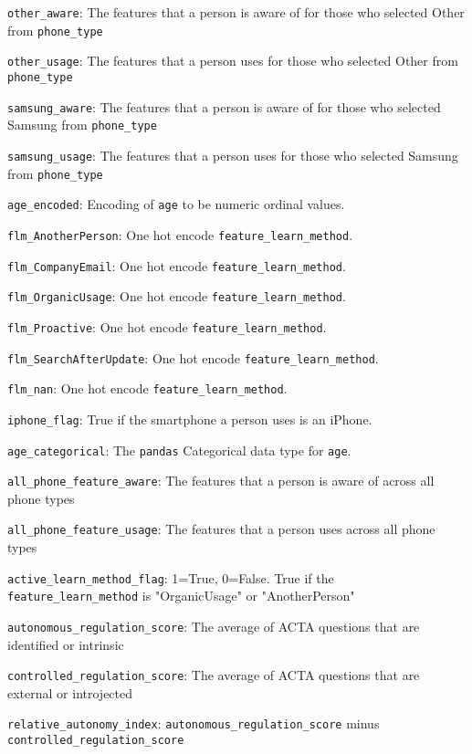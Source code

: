 \item \texttt{other\_aware}: The features that a person is aware of for those who selected Other from \texttt{phone\_type}
\item \texttt{other\_usage}: The features that a person uses for those who selected Other from \texttt{phone\_type}
\item \texttt{samsung\_aware}: The features that a person is aware of for those who selected Samsung from \texttt{phone\_type}
\item \texttt{samsung\_usage}: The features that a person uses for those who selected Samsung from \texttt{phone\_type}
\item \texttt{age\_encoded}: Encoding of \texttt{age} to be numeric ordinal values.
\item \texttt{flm\_AnotherPerson}: One hot encode \texttt{feature\_learn\_method}.
\item \texttt{flm\_CompanyEmail}: One hot encode \texttt{feature\_learn\_method}.
\item \texttt{flm\_OrganicUsage}: One hot encode \texttt{feature\_learn\_method}.
\item \texttt{flm\_Proactive}: One hot encode \texttt{feature\_learn\_method}.
\item \texttt{flm\_SearchAfterUpdate}: One hot encode \texttt{feature\_learn\_method}.
\item \texttt{flm\_nan}: One hot encode \texttt{feature\_learn\_method}.
\item \texttt{iphone\_flag}: True if the smartphone a person uses is an iPhone.
\item \texttt{age\_categorical}: The \texttt{pandas} Categorical data type for \texttt{age}.
\item \texttt{all\_phone\_feature\_aware}: The features that a person is aware of across all phone types
\item \texttt{all\_phone\_feature\_usage}: The features that a person uses across all phone types
\item \texttt{active\_learn\_method\_flag}: 1=True, 0=False. True if the \texttt{feature\_learn\_method} is "OrganicUsage" or "AnotherPerson"
\item \texttt{autonomous\_regulation\_score}: The average of ACTA questions that are identified or intrinsic
\item \texttt{controlled\_regulation\_score}: The average of ACTA questions that are external or introjected
\item \texttt{relative\_autonomy\_index}: \texttt{autonomous\_regulation\_score} minus \texttt{controlled\_regulation\_score}